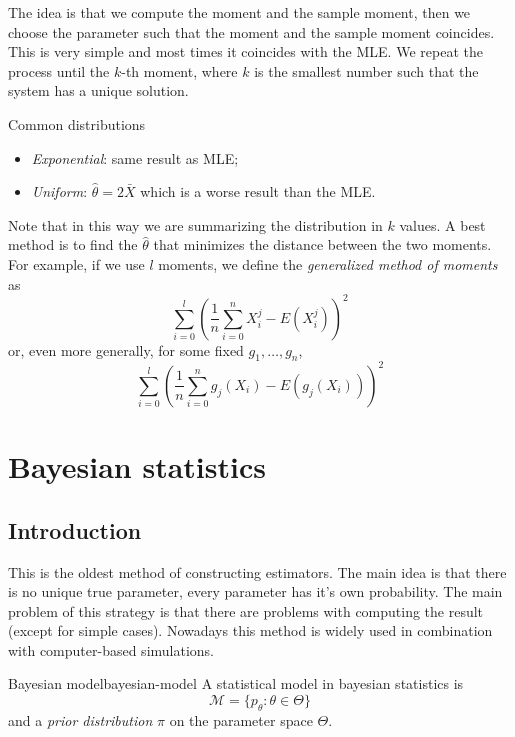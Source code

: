 \documentclass[12pt]{extarticle}
\begin{document}
The idea is that we compute the moment and the sample moment, then we choose the parameter such that the moment and the sample moment coincides.
This is very simple and most times it coincides with the MLE.
We repeat the process until the $k$-th moment, where $k$ is the smallest number such that the system has a unique solution.

\begin{example}{Common distributions}{}
    \begin{itemize}
        \item \emph{Exponential}: same result as MLE;
        \item \emph{Uniform}: $\hat \theta = 2 \bar X$ which is a worse result than the MLE.
    \end{itemize}
\end{example}

Note that in this way we are summarizing the distribution in $k$ values. A best method is to find the $\hat \theta$ that minimizes the distance between the two moments.
For example, if we use $l$ moments, we define the \emph{generalized method of moments} as
\begin{equation}
    \sum_{i = 0}^l \left( \frac{1}{n} \sum_{i = 0}^n X^j_i - E(X_i^j) \right)^2
\end{equation}
or, even more generally, for some fixed $g_1, \dots, g_n$,
\begin{equation}
    \sum_{i = 0}^l \left( \frac{1}{n} \sum_{i = 0}^n g_j(X_i) - E(g_j(X_i)) \right)^2
\end{equation}

\section{Bayesian statistics}

\subsection{Introduction}

This is the oldest method of constructing estimators.
The main idea is that there is no unique true parameter, every parameter has it's own probability.
The main problem of this strategy is that there are problems with computing the result (except for simple cases).
Nowadays this method is widely used in combination with computer-based simulations.

\begin{definition}{Bayesian model}{bayesian-model}
    A statistical model in bayesian statistics is
    \begin{equation}
        \mathcal M = \{ p_\theta : \theta \in \Theta \}
    \end{equation}
    and a \emph{prior distribution} $\pi$ on the parameter space $\Theta$.
\end{definition}
\end{document}
